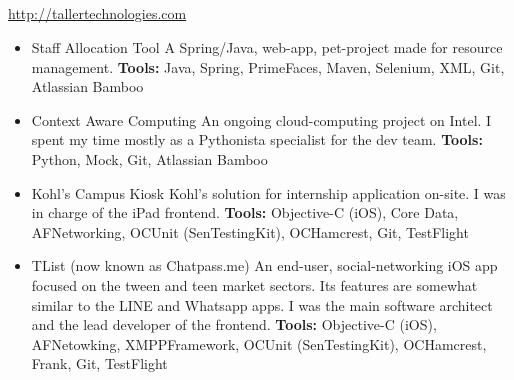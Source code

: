 \documentclass[11pt,a4paper,english]{moderncv}
\begin{document}
\subsection{}

{
\url{http://tallertechnologies.com}
\newline{}
\begin{itemize}
    \item Staff Allocation Tool
        \newline{}
        A Spring/Java, web-app, pet-project made for resource management.
        \newline{}
        \textbf{Tools:} Java, Spring, PrimeFaces, Maven, Selenium, XML, Git, Atlassian Bamboo
    \item Context Aware Computing
        \newline{}
        An ongoing cloud-computing project on Intel. I spent my time mostly as a Pythonista specialist for the dev team.
        \newline{}
        \textbf{Tools:} Python, Mock, Git, Atlassian Bamboo
    \item Kohl's Campus Kiosk
        \newline{}
        Kohl's solution for internship application on-site. I was in charge of the iPad frontend.
        \newline{}
        \textbf{Tools:} Objective-C (iOS), Core Data, AFNetworking, OCUnit (SenTestingKit), OCHamcrest, Git, TestFlight
    \item TList (now known as Chatpass.me)
        \newline{}
        An end-user, social-networking iOS app focused on the tween and teen market sectors. Its features are somewhat similar to the LINE and Whatsapp apps. I was the main software architect and the lead developer of the frontend.
        \newline{}
        \textbf{Tools:} Objective-C (iOS), AFNetowking, XMPPFramework, OCUnit (SenTestingKit), OCHamcrest, Frank, Git, TestFlight
\end{itemize}
}

\subsection{}
\end{document}
